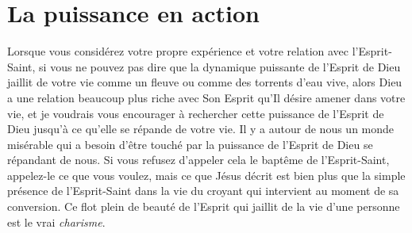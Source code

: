 \section{La puissance en action}


Lorsque vous considérez votre propre expérience 
 et votre relation 
 avec l'Esprit-Saint, si vous ne pouvez pas dire que la dynamique puissante
 de l'Esprit de Dieu jaillit de votre vie comme un fleuve ou comme
 des torrents d'eau vive, alors Dieu a une relation beaucoup plus riche
 avec Son Esprit qu'Il désire amener dans votre vie,
 et je voudrais vous encourager à rechercher cette puissance de l'Esprit
 de Dieu jusqu'à ce qu'elle se répande de votre vie.
 Il y a autour de nous un monde misérable qui a besoin d'être touché
 par la puissance de l'Esprit de Dieu se répandant de nous.
 Si vous refusez d'appeler cela le baptême de l'Esprit-Saint,
 appelez-le ce que vous voulez, mais ce que Jésus décrit est bien plus
 que la simple présence de l'Esprit-Saint dans la vie du croyant
 qui intervient au moment de sa conversion. Ce flot plein de beauté de l'Esprit
 qui jaillit de la vie d'une personne est le vrai \emph{charisme}.
\thispagestyle{chapterend}

